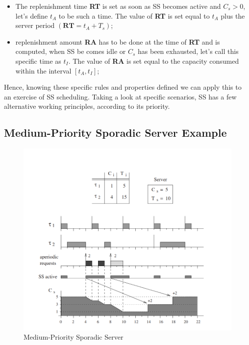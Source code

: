 \documentclass[conference]{IEEEtran}
\begin{document}
\begin{itemize}
    \item The replenishment time \textbf{RT} is set as soon as SS becomes active and $C_s > 0$, let's define $t_A$ to be such a time. The value of \textbf{RT} is set equal to $t_A$ plus the server period $(\textbf{RT} = t_A + T_s)$;
    \item  replenishment amount \textbf{RA} has to be done at the time of \textbf{RT} and is computed, when SS be comes idle or $C_s$ has been exhausted, let's call this specific time as $t_I$. The value of \textbf{RA} is set equal to the capacity consumed within the interval $[t_A, t_I]$;
\end{itemize}

Hence, knowing these specific rules and properties defined we can apply this to an exercise of SS scheduling. Taking a look at specific scenarios, SS has a few alternative working principles, according to its priority.

\subsection{Medium-Priority Sporadic Server Example}

\begin{figure}[htbp]
\centerline{\includegraphics[scale=.38]{Example1.png}}
\caption{Medium-Priority Sporadic Server \cite{b1}}
\label{example1}
\end{figure}
\end{document}
